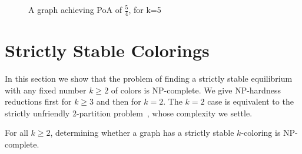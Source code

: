\documentclass{llncs}
\begin{document}
\begin{figure}[htb]
\centering
{}
\caption{A graph achieving PoA of $\frac{5}{4}$, for k=5}
\label{fig:k5copies}
\end{figure}

\section{Strictly Stable Colorings}

In this section we show that the problem of finding a strictly stable
equilibrium with any fixed number $k \geq 2$ of colors is NP-complete.  We give
NP-hardness reductions first for $k \geq 3$ and then for $k=2$.  The $k=2$ case
is equivalent to the strictly unfriendly $2$-partition
problem~\cite{ShafiqueD09}, whose complexity we settle.

\begin{theorem} 
For all $k \geq 2$, determining whether a graph has a strictly stable
$k$-coloring is NP-complete.  
\end{theorem}
\end{document}
